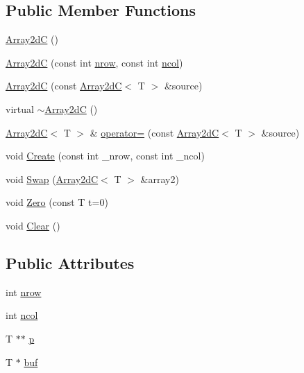 \subsection*{Public Member Functions}
\begin{DoxyCompactItemize}
\item 
\mbox{\hyperlink{class_array2d_c_a740d2592aa5563d59ff429311c51a04e}{Array2dC}} ()
\item 
\mbox{\hyperlink{class_array2d_c_a626db69cb139292c8249114172c10528}{Array2dC}} (const int \mbox{\hyperlink{class_array2d_c_a12f690f7195f7674a86a7e1eedbc473c}{nrow}}, const int \mbox{\hyperlink{class_array2d_c_a27e0f8f40f644831cd7c750db59dc28a}{ncol}})
\item 
\mbox{\hyperlink{class_array2d_c_aeeeddbaec65066f750615a130ef0f9da}{Array2dC}} (const \mbox{\hyperlink{class_array2d_c}{Array2dC}}$<$ T $>$ \&source)
\item 
virtual \mbox{\hyperlink{class_array2d_c_a96e68b849ec674616b79dc9d0c9233ab}{$\sim$\+Array2dC}} ()
\item 
\mbox{\hyperlink{class_array2d_c}{Array2dC}}$<$ T $>$ \& \mbox{\hyperlink{class_array2d_c_a241cc9224f991e0496dad95bc396e84e}{operator=}} (const \mbox{\hyperlink{class_array2d_c}{Array2dC}}$<$ T $>$ \&source)
\item 
void \mbox{\hyperlink{class_array2d_c_abfe87be7641dfc586b9e7bffebcca9ec}{Create}} (const int \+\_\+nrow, const int \+\_\+ncol)
\item 
void \mbox{\hyperlink{class_array2d_c_ae8cbeb3e4fdc3a45cc188ecc1b317919}{Swap}} (\mbox{\hyperlink{class_array2d_c}{Array2dC}}$<$ T $>$ \&array2)
\item 
void \mbox{\hyperlink{class_array2d_c_a5e1d7837fd208699694fc3fc97151df0}{Zero}} (const T t=0)
\item 
void \mbox{\hyperlink{class_array2d_c_a76a406cfeb9a9f75a1586e0a7b22f63e}{Clear}} ()
\end{DoxyCompactItemize}
\subsection*{Public Attributes}
\begin{DoxyCompactItemize}
\item 
int \mbox{\hyperlink{class_array2d_c_a12f690f7195f7674a86a7e1eedbc473c}{nrow}}
\item 
int \mbox{\hyperlink{class_array2d_c_a27e0f8f40f644831cd7c750db59dc28a}{ncol}}
\item 
T $\ast$$\ast$ \mbox{\hyperlink{class_array2d_c_a727eae5d663d463635cc150e6f771f0d}{p}}
\item 
T $\ast$ \mbox{\hyperlink{class_array2d_c_a25d8fa5049d4c7ded126e0acdd18f37a}{buf}}
\end{DoxyCompactItemize}


